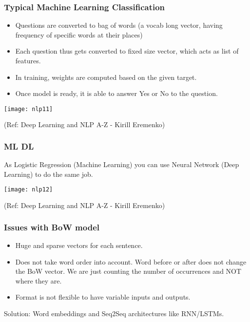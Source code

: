 \begin{frame}[fragile]\frametitle{Typical Machine Learning Classification}
	\begin{itemize}
	\item Questions are converted to bag of words (a vocab long vector, having frequency of specific words at their places)
		\item Each question thus gets converted to fixed size vector, which acts as list of features.
		\item In training, weights are computed based on the given target.
		\item Once model is ready, it is able to answer Yes or No to the question.
			\end{itemize}
\begin{center}
\texttt{[image: nlp11]}

\tiny{(Ref: Deep Learning and NLP A-Z - Kirill Eremenko)}
\end{center}

\end{frame}

\begin{frame}[fragile]\frametitle{ML DL}
As Logistic Regression (Machine Learning) you can use Neural Network (Deep Learning) to do the same job.

\begin{center}
\texttt{[image: nlp12]}

\tiny{(Ref: Deep Learning and NLP A-Z - Kirill Eremenko)}
\end{center}

\end{frame}

\begin{frame}[fragile]\frametitle{Issues with BoW model}
\begin{itemize}
\item Huge and sparse vectors for each sentence.
\item Does not take word order into account. Word before or after does not change the BoW vector. We are just counting the number of occurrences and NOT where they are.
\item Format is not flexible to have variable inputs and outputs.
\end{itemize}
			
Solution: Word embeddings and Seq2Seq architectures like RNN/LSTMs.

\end{frame}

